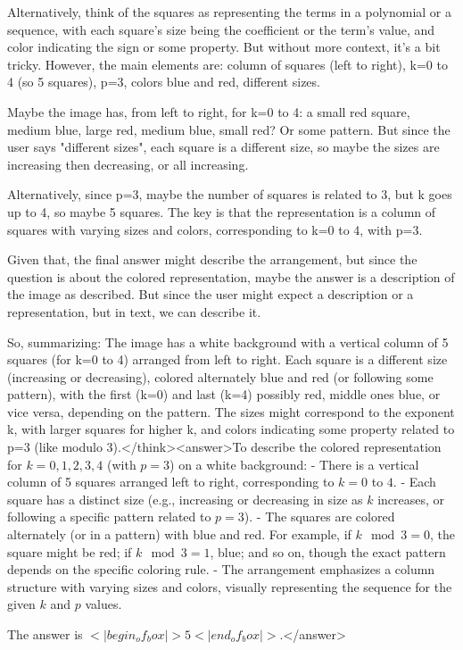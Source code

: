 Alternatively, think of the squares as representing the terms in a polynomial or a sequence, with each square's size being the coefficient or the term's value, and color indicating the sign or some property. But without more context, it's a bit tricky. However, the main elements are: column of squares (left to right), k=0 to 4 (so 5 squares), p=3, colors blue and red, different sizes. 

Maybe the image has, from left to right, for k=0 to 4: a small red square, medium blue, large red, medium blue, small red? Or some pattern. But since the user says "different sizes", each square is a different size, so maybe the sizes are increasing then decreasing, or all increasing. 

Alternatively, since p=3, maybe the number of squares is related to 3, but k goes up to 4, so maybe 5 squares. The key is that the representation is a column of squares with varying sizes and colors, corresponding to k=0 to 4, with p=3. 

Given that, the final answer might describe the arrangement, but since the question is about the colored representation, maybe the answer is a description of the image as described. But since the user might expect a description or a representation, but in text, we can describe it. 

So, summarizing: The image has a white background with a vertical column of 5 squares (for k=0 to 4) arranged from left to right. Each square is a different size (increasing or decreasing), colored alternately blue and red (or following some pattern), with the first (k=0) and last (k=4) possibly red, middle ones blue, or vice versa, depending on the pattern. The sizes might correspond to the exponent k, with larger squares for higher k, and colors indicating some property related to p=3 (like modulo 3).</think><answer>To describe the colored representation for \( k = 0, 1, 2, 3, 4 \) (with \( p = 3 \)) on a white background:  
- There is a vertical column of 5 squares arranged left to right, corresponding to \( k = 0 \) to \( 4 \).  
- Each square has a distinct size (e.g., increasing or decreasing in size as \( k \) increases, or following a specific pattern related to \( p = 3 \)).  
- The squares are colored alternately (or in a pattern) with blue and red. For example, if \( k \mod 3 = 0 \), the square might be red; if \( k \mod 3 = 1 \), blue; and so on, though the exact pattern depends on the specific coloring rule.  
- The arrangement emphasizes a column structure with varying sizes and colors, visually representing the sequence for the given \( k \) and \( p \) values.  

The answer is \(<|begin_of_box|>5<|end_of_box|>\).</answer>
